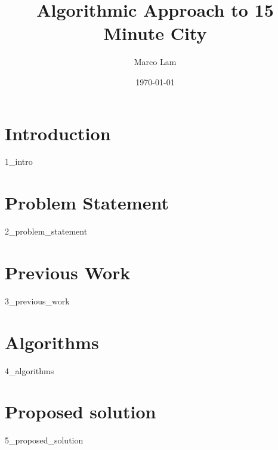 \documentclass{article}
\title{Algorithmic Approach to 15 Minute City}
\author{Marco Lam}
\date{\today}
\begin{document}
\maketitle

\newpage

\tableofcontents

\newpage

\section{Introduction}

{1_intro}

\section{Problem Statement}

{2_problem_statement}

\section{Previous Work}

{3_previous_work}

\section{Algorithms}

{4_algorithms}

\section{Proposed solution}

{5_proposed_solution}


\end{document}
